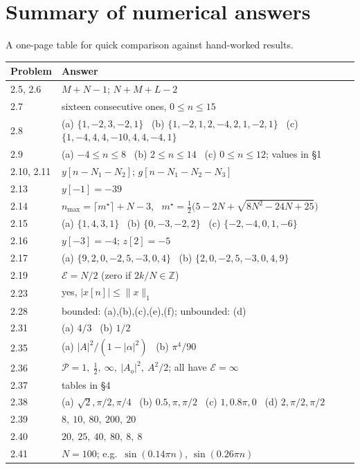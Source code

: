 \section{Summary of numerical answers}

A one-page table for quick comparison against hand-worked results.

\begin{center}
\renewcommand{\arraystretch}{1.3}
\footnotesize
\begin{tabular}{@{}ll@{}}
\toprule
\textbf{Problem} & \textbf{Answer}\\
\midrule
2.5, 2.6 & $M+N-1$; \quad $N+M+L-2$\\
2.7 & sixteen consecutive ones, $0\le n\le15$\\
2.8 & (a) $\{1,-2,3,-2,1\}$ \ (b) $\{1,-2,1,2,-4,2,1,-2,1\}$ \ (c) $\{1,-4,4,4,-10,4,4,-4,1\}$\\
2.9 & (a) $-4\le n\le8$ \ (b) $2\le n\le14$ \ (c) $0\le n\le12$; values in \S1\\
2.10, 2.11 & $y[n-N_1-N_2]$; \quad $g[n-N_1-N_2-N_3]$\\
2.13 & $y[-1]=-39$\\
2.14 & $n_{\max}=\lceil m^\star\rceil+N-3$, \ $m^\star=\tfrac12\bigl(5-2N+\sqrt{8N^2-24N+25}\bigr)$\\
2.15 & (a) $\{1,4,3,1\}$ \ (b) $\{0,-3,-2,2\}$ \ (c) $\{-2,-4,0,1,-6\}$\\
2.16 & $y[-3]=-4$; \quad $z[2]=-5$\\
2.17 & (a) $\{9,2,0,-2,5,-3,0,4\}$ \ (b) $\{2,0,-2,5,-3,0,4,9\}$\\
2.19 & $\mathcal{E}=N/2$ (zero if $2k/N\in\mathbb{Z}$)\\
2.23 & yes, $|x[n]|\le\|x\|_1$\\
2.28 & bounded: (a),(b),(c),(e),(f); unbounded: (d)\\
2.31 & (a) $4/3$ \ (b) $1/2$\\
2.35 & (a) $|A|^2/(1-|\alpha|^2)$ \ (b) $\pi^4/90$\\
2.36 & $\mathcal{P}=1,\ \tfrac12,\ \infty,\ |A_o|^2,\ A^2/2$; all have $\mathcal{E}=\infty$\\
2.37 & tables in \S4\\
2.38 & (a) $\sqrt2,\pi/2,\pi/4$ \ (b) $0.5,\pi,\pi/2$ \ (c) $1,0.8\pi,0$ \ (d) $2,\pi/2,\pi/2$\\
2.39 & $8,\ 10,\ 80,\ 200,\ 20$\\
2.40 & $20,\ 25,\ 40,\ 80,\ 8,\ 8$\\
2.41 & $N=100$; e.g.\ $\sin(0.14\pi n)$, $\sin(0.26\pi n)$\\

\end{tabular}
\end{center}
